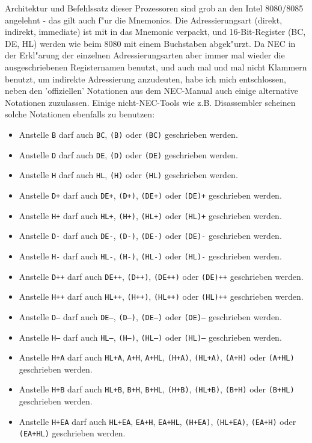 \documentclass[12pt,a4paper,twoside]{report}
\newcommand{\tty}[1]{{\tt #1}}
\begin{document}
Architektur und Befehlssatz dieser Prozessoren sind grob an den
Intel 8080/8085 angelehnt - das gilt auch f"ur die Mnemonics.  Die
Adressierungsart (direkt, indirekt, immediate) ist mit in das
Mnemonic verpackt, und 16-Bit-Register (BC, DE, HL) werden wie
beim 8080 mit einem Buchstaben abgek"urzt.  Da NEC in der
Erkl"arung der einzelnen Adressierungsarten aber immer mal
wieder die ausgeschriebenen Registernamen benutzt, und auch mal
und mal nicht Klammern benutzt, um indirekte Adressierung anzudeuten,
habe ich mich entschlossen, neben den 'offiziellen'
Notationen aus dem NEC-Manual auch einige alternative Notationen
zuzulassen.  Einige nicht-NEC-Tools wie z.B. Disassembler
scheinen solche Notationen ebenfalls zu benutzen:

\begin{itemize}
\item{Anstelle \tty{B} darf auch \tty{BC}, \tty{(B)} oder
      \tty{(BC)} geschrieben werden.}
\item{Anstelle \tty{D} darf auch \tty{DE}, \tty{(D)} oder
      \tty{(DE)} geschrieben werden.}
\item{Anstelle \tty{H} darf auch \tty{HL}, \tty{(H)} oder
      \tty{(HL)} geschrieben werden.}
\item{Anstelle \tty{D+} darf auch \tty{DE+}, \tty{(D+)},
      \tty{(DE+)} oder \tty{(DE)+} geschrieben werden.}
\item{Anstelle \tty{H+} darf auch \tty{HL+}, \tty{(H+)},
      \tty{(HL+)} oder \tty{(HL)+} geschrieben werden.}
\item{Anstelle \tty{D-} darf auch \tty{DE-}, \tty{(D-)},
      \tty{(DE-)} oder \tty{(DE)-} geschrieben werden.}
\item{Anstelle \tty{H-} darf auch \tty{HL-}, \tty{(H-)},
      \tty{(HL-)} oder \tty{(HL)-} geschrieben werden.}
\item{Anstelle \tty{D++} darf auch \tty{DE++}, \tty{(D++)},
      \tty{(DE++)} oder \tty{(DE)++} geschrieben werden.}
\item{Anstelle \tty{H++} darf auch \tty{HL++}, \tty{(H++)},
      \tty{(HL++)} oder \tty{(HL)++} geschrieben werden.}
\item{Anstelle \tty{D--} darf auch \tty{DE--}, \tty{(D--)},
      \tty{(DE--)} oder \tty{(DE)--} geschrieben werden.}
\item{Anstelle \tty{H--} darf auch \tty{HL--}, \tty{(H--)},
      \tty{(HL--)} oder \tty{(HL)--} geschrieben werden.}
\item{Anstelle \tty{H+A} darf auch \tty{HL+A}, \tty{A+H},
      \tty{A+HL}, \tty{(H+A)}, \tty{(HL+A)}, \tty{(A+H)}
      oder \tty{(A+HL)} geschrieben werden.}
\item{Anstelle \tty{H+B} darf auch \tty{HL+B}, \tty{B+H},
      \tty{B+HL}, \tty{(H+B)}, \tty{(HL+B)}, \tty{(B+H)}
      oder \tty{(B+HL)} geschrieben werden.}
\item{Anstelle \tty{H+EA} darf auch \tty{HL+EA}, \tty{EA+H},
      \tty{EA+HL}, \tty{(H+EA)}, \tty{(HL+EA)}, \tty{(EA+H)}
      oder \tty{(EA+HL)} geschrieben werden.}
\end{itemize}
\end{document}
